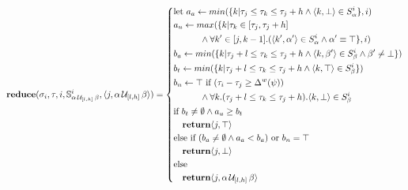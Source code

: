 \begin{align*}
\mathbf{reduce}(\sigma_i,\tau, i,\mathbb{S}^i_{\alpha\, \mathcal{U}_{[l,h]}\, \beta} ,\langle j, \alpha\, \mathcal{U}_{[l,h]}\, \beta \rangle) = \left\{
\begin{aligned}
&\text{let } a_a \leftarrow min(\{k | \tau_j \leq \tau_k \leq \tau_j+h  \wedge \langle k, \bot \rangle \in S^i_\alpha \},i) \\ 
& a_u \leftarrow max(\{k| \tau_k \in [\tau_j,\tau_j+h] \\
& \quad \quad \quad \wedge \forall k' \in [j,k-1].(\langle k', \alpha' \rangle \in S^i_\alpha \wedge \alpha' \equiv \top\},i) \\
& b_a \leftarrow min(\{k | \tau_j+l \leq \tau_k \leq \tau_j+h \wedge \langle k, \beta' \rangle \in S^i_\beta \wedge \beta' \neq \bot\}) \\ 
&b_t \leftarrow min(\{k | \tau_j+l \leq \tau_k \leq \tau_j+h \wedge \langle k, \top \rangle \in S^i_{\beta} \}) \\
&b_n \leftarrow \top \text{ if } (\tau_i - \tau_j \geq \Delta^w(\psi)) \\
& \quad \quad \quad \wedge \forall k.(\tau_j+l \leq \tau_k \leq \tau_j+h). \langle k, \bot \rangle \in S^i_{\beta} \\
&\text{if } b_t \neq \emptyset \wedge a_u \geq b_t \\
& \quad\mathbf{return} \langle j, \top \rangle \\
&\text{else if } (b_a \neq \emptyset \wedge a_a < b_a) \text{ or } b_n = \top\\ & \quad\mathbf{return} \langle j, \bot \rangle \\
&\text{else} \\
& \quad\mathbf{return} \langle j, \alpha\, \mathcal{U}_{[l,h]}\, \beta \rangle
\end{aligned} \right. \\
\end{align*}

